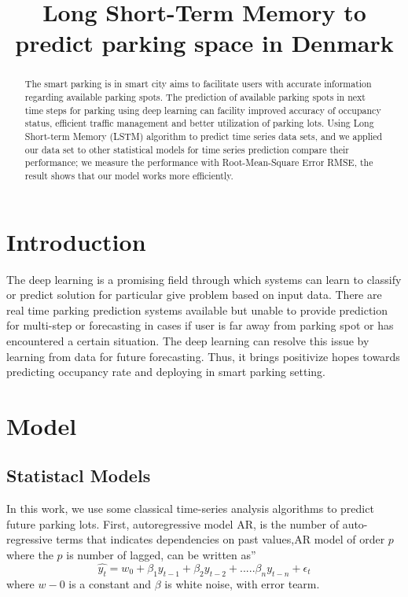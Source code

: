\documentclass[10pt, conference, compsocconf]{IEEEtran}
\begin{document}
\title{Long Short-Term Memory to predict parking space in Denmark }
\author{
}
\maketitle
\begin{abstract}
The smart parking is in smart city aims to facilitate users with accurate information regarding available parking spots. The prediction of available parking spots in next time steps for parking using deep learning can facility improved accuracy of occupancy status, efficient traffic management and better utilization of parking lots. Using Long Short-term Memory (LSTM) algorithm to predict time series data sets, and we applied our data set to other statistical models for time series prediction compare their performance; we measure the performance with Root-Mean-Square Error RMSE,
the result shows that our model works more efficiently.
\end{abstract}
\IEEEpeerreviewmaketitle
\section{Introduction}
The deep learning is a promising field through which systems can learn to classify or predict solution for particular give problem based on input data. There are real time parking prediction systems available but unable to provide prediction for multi-step or forecasting in cases if user is far away from parking spot or has encountered a certain situation. The deep learning can resolve this issue by learning from data for future forecasting. Thus, it brings positivize hopes towards predicting occupancy rate and deploying in smart parking setting.

\section{Model}

\subsection{Statistacl Models}
In this work, we use some classical time-series analysis algorithms to predict future parking lots. First, autoregressive model AR, is the number of auto-regressive terms that indicates dependencies on past values,AR model of order \(p\) where the  \(p\) is number of lagged, can be written as''
\begin{equation}
\hat{y_t} = w_0 +\beta_1 y_{t-1}+ \beta_2 y_{t-2}+.....\beta_n y_{t-n}+\epsilon_t
\label{Eq-AR}
\end{equation}
where  \(w-0\) is a constant and \(\beta\) is white noise, with error tearm.
\end{document}
